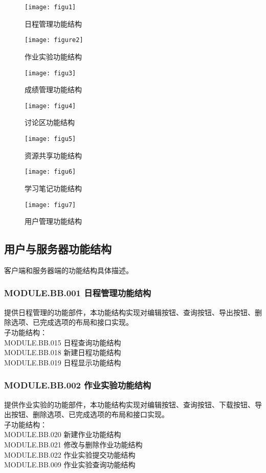 \begin{figure}[H]
\centering
\texttt{[image: figu1]}
\caption{日程管理功能结构}
\end{figure}

\begin{figure}[H]
\centering
\texttt{[image: figure2]}
\caption{作业实验功能结构}
\end{figure}

\begin{figure}[H]
\centering
\texttt{[image: figu3]}
\caption{成绩管理功能结构}
\end{figure}

\begin{figure}[H]
\centering
\texttt{[image: figu4]}
\caption{讨论区功能结构}
\end{figure}

\begin{figure}[H]
\centering
\texttt{[image: figu5]}
\caption{资源共享功能结构}
\end{figure}

\begin{figure}[H]
\centering
\texttt{[image: figu6]}
\caption{学习笔记功能结构}
\end{figure}

\begin{figure}[H]
\centering
\texttt{[image: figu7]}
\caption{用户管理功能结构}
\end{figure}

\subsection{用户与服务器功能结构}

客户端和服务器端的功能结构具体描述。

\subsubsection{MODULE.BB.001    日程管理功能结构}
提供日程管理的功能部件，本功能结构实现对编辑按钮、查询按钮、导出按钮、删除选项、已完成选项的布局和接口实现。
\\子功能结构：
\\MODULE.BB.015 日程查询功能结构
\\MODULE.BB.018 新建日程功能结构
\\MODULE.BB.019 日程显示功能结构

\subsubsection{MODULE.BB.002    作业实验功能结构}
提供作业实验的功能部件，本功能结构实现对编辑按钮、查询按钮、下载按钮、导出按钮、删除选项、已完成选项的布局和接口实现。
\\子功能结构：
\\MODULE.BB.020 新建作业功能结构
\\MODULE.BB.021 修改与删除作业功能结构
\\MODULE.BB.022 作业实验提交功能结构
\\MODULE.BB.009 作业实验查询功能结构

